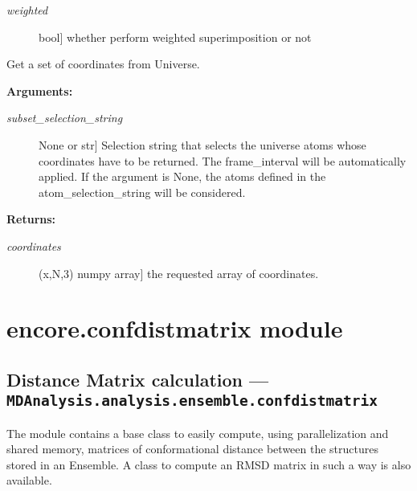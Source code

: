 \documentclass[letterpaper,10pt,english]{sphinxmanual}
\begin{document}
\begin{fulllineitems}
\begin{fulllineitems}
\begin{description}
\item[{\emph{weighted}}] \leavevmode{[}bool{]}
whether perform weighted superimposition or not

\end{description}

\end{fulllineitems}


\begin{fulllineitems}
\label{index:encore.Ensemble.Ensemble.get_coordinates}
Get a set of coordinates from Universe.

\textbf{Arguments:}
\begin{description}
\item[{\emph{subset\_selection\_string}}] \leavevmode{[}None or str{]}
Selection string that selects the universe atoms whose coordinates have to be returned. The frame\_interval will be automatically applied.
If the argument is None,  the atoms defined in the atom\_selection\_string will be considered.

\end{description}

\textbf{Returns:}
\begin{description}
\item[{\emph{coordinates}}] \leavevmode{[}(x,N,3) numpy array{]}
the requested array of coordinates.

\end{description}

\end{fulllineitems}


\end{fulllineitems}



\section{encore.confdistmatrix module}
\label{index:encore-confdistmatrix-module}\label{index:module-encore.confdistmatrix}

\subsection{Distance Matrix calculation --- \texttt{MDAnalysis.analysis.ensemble.confdistmatrix}}
\label{index:distance-matrix-calculation-mdanalysis-analysis-ensemble-confdistmatrix}
The module contains a base class to easily compute, using parallelization and shared memory, matrices of conformational distance between the structures stored in an Ensemble.
A class to compute an RMSD matrix in such a way is also available.
\end{document}

